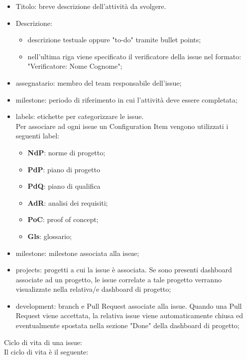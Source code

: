 \begin{itemize}
	\item Titolo: breve descrizione dell’attività da svolgere.
	\item Descrizione:
	      \begin{itemize}
		      \item descrizione testuale oppure "to-do" tramite bullet points;
		      \item nell'ultima riga viene specificato il verificatore della issue nel formato: "Verificatore: Nome Cognome";
	      \end{itemize}
	\item assegnatario: membro del team responsabile dell'issue;
	\item milestone: periodo di riferimento in cui l’attività deve essere completata;
	\item labels: etichette per categorizzare le issue. \\Per associare ad ogni issue un Configuration Item vengono utilizzati i seguenti label:
	      \begin{itemize}
		      \item \textbf{NdP}: norme di progetto;
		      \item \textbf{PdP}: piano di progetto
		      \item \textbf{PdQ}: piano di qualifica
		      \item \textbf{AdR}: analisi dei requisiti;
		      \item \textbf{PoC}: proof of concept;
		      \item \textbf{Gls}: glossario;
	      \end{itemize}
	\item milestone: milestone associata alla issue;
	\item projects: progetti a cui la issue è associata. Se sono presenti dashboard associate ad un progetto, le issue correlate a tale progetto verranno visualizzate nella relativa/e dashboard di progetto;
	\item development: branch e Pull Request associate alla issue. Quando una Pull Request viene accettata, la relativa issue viene automaticamente chiusa ed eventualmente spostata nella sezione "Done" della dashboard di progetto;
\end{itemize}
Ciclo di vita di una issue:\\
Il ciclo di vita è il seguente:
